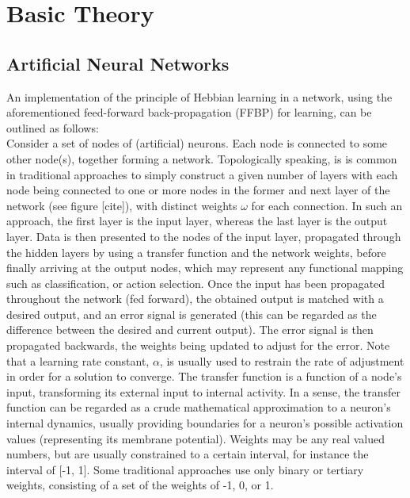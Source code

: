 
\chapter{Basic Theory}

\section{Artificial Neural Networks}

An implementation of the principle of Hebbian learning in a network, using the aforementioned feed-forward back-propagation (FFBP) for learning, can be outlined as follows:
\\
Consider a set of nodes of (artificial) neurons. Each node is connected to some other node(s), together forming a network. Topologically speaking, is is common in traditional approaches to simply construct a given number of layers with each node being connected to one or more nodes in the former and next layer of the network (see figure [cite]), with distinct weights $\omega$ for each connection. In such an approach, the first layer is the input layer, whereas the last layer is the output layer. Data is then presented to the nodes of the input layer, propagated through the hidden layers by using a transfer function and the network weights, before finally arriving at the output nodes, which may represent any functional mapping such as classification, or action selection. Once the input has been propagated throughout the network (fed forward), the obtained output is matched with a desired output, and an error signal is generated (this can be regarded as the difference between the desired and current output). The error signal is then propagated backwards, the weights being updated to adjust for the error. Note that a learning rate constant, $\alpha$, is usually used to restrain the rate of adjustment in order for a solution to converge.
The transfer function is a function of a node's input, transforming its external input to internal activity. In a sense, the transfer function can be regarded as a crude mathematical approximation to a neuron's internal dynamics, usually providing boundaries for a neuron's possible activation values (representing its membrane potential). Weights may be any real valued numbers, but are usually constrained to a certain interval, for instance the interval of [-1, 1]. Some traditional approaches use only binary or tertiary weights, consisting of a set of the weights of -1, 0, or 1.
